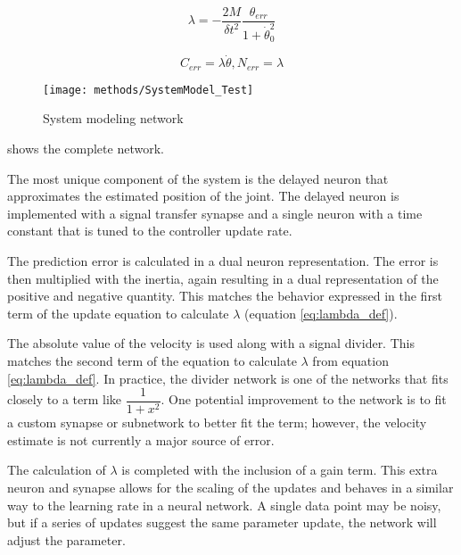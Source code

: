 \begin{equation}
\lambda 
=
- \dfrac{2M}{\delta t^{2}} \dfrac{\theta_{err}}{1 + \dot{\theta}_{0}^{2}}
\end{equation}

\begin{equation}
C_{err} = \lambda \dot{\theta}, N_{err} = \lambda
\end{equation}

\begin{figure}
\centering
\texttt{[image: methods/SystemModel\_Test]}
\caption{System modeling network}
\label{fig:SystemModelNetwork}
\end{figure}

 shows the complete network.



The most unique component of the system is the delayed neuron that approximates
the estimated position of the joint. The delayed neuron is implemented with a signal transfer
synapse and a single neuron with a time constant that is tuned to the controller
update rate.


The prediction error is calculated in a dual neuron representation. The
error is then multiplied with the inertia, again resulting in a dual 
representation of the positive and negative quantity. This matches the behavior
expressed in the first term of the update equation to calculate $\lambda$ (equation \ref{eq:lambda_def}).


The absolute value of the velocity is used along with a signal divider. This
matches the second term of the equation to calculate $\lambda$ from equation \ref{eq:lambda_def}. In practice,
the divider network is one of the networks that fits closely to a term like
$\dfrac{1}{1 + x^{2}}$. One potential improvement to the network is to fit
a custom synapse or subnetwork to better fit the term; however, the velocity estimate is not
currently a major source of error.


The calculation of $\lambda$ is completed with the inclusion of a gain term. This extra neuron and synapse
allows for the scaling of the updates and behaves in a similar way to the 
learning rate in a neural network. A single data point may be noisy, but if a 
series of updates suggest the same parameter update, the network will adjust the
parameter.

